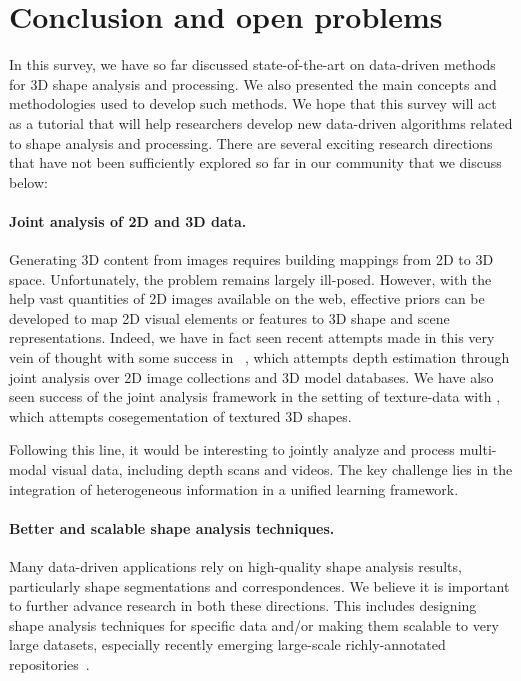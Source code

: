 \section{Conclusion and open problems}
\label{sec:conclusion}

In this survey, we have so far discussed state-of-the-art on data-driven methods for 3D shape analysis and processing. We also presented the main concepts and methodologies used to develop such methods. We hope that this survey will act as a tutorial that will help researchers develop new data-driven algorithms related to shape analysis and processing. There are several exciting research directions that have not been sufficiently explored so far in our community that we discuss below:

\paragraph*{Joint analysis of 2D and 3D data.}
Generating 3D content from images requires building mappings from 2D to 3D space. Unfortunately, the problem remains largely ill-posed.  However, with the help vast quantities of 2D images available on the web, effective priors can be developed to map 2D visual elements or features to 3D shape and scene representations.
Indeed, we have in fact seen recent attempts made in this very vein of thought with some success in ~\cite{Su:2014:EID,Aubry14,Li:2015:JE,Hueting:2015:CL,Su:2015:RfC}, which attempts depth estimation through joint analysis over 2D image collections and 3D model databases.  We have also seen success of the joint analysis framework in the setting of texture-data with \cite{Yumer:CST:2014}, which attempts cosegementation of textured 3D shapes.


Following this line, it would be interesting to jointly analyze and process multi-modal visual data, including depth scans and videos. The key challenge lies in the integration of heterogeneous information in a unified learning framework.

\paragraph*{Better and scalable shape analysis techniques.} Many data-driven applications rely on high-quality shape analysis results, particularly shape segmentations and correspondences. We believe it is important to further advance research in both these directions. This includes designing shape analysis techniques for specific data and/or making them scalable to very large datasets, especially recently emerging large-scale richly-annotated repositories~\cite{Shapenet}.

